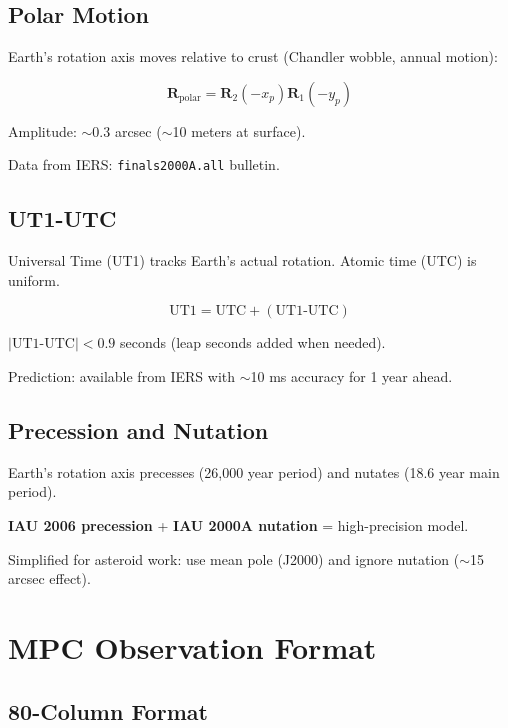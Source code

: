 \subsection{Polar Motion}

Earth's rotation axis moves relative to crust (Chandler wobble, annual motion):

\begin{equation}
    \mathbf{R}_{\text{polar}} = \mathbf{R}_2(-x_p)\mathbf{R}_1(-y_p)
\end{equation}

Amplitude: $\sim$0.3 arcsec ($\sim$10 meters at surface).

Data from IERS: \texttt{finals2000A.all} bulletin.

\subsection{UT1-UTC}

Universal Time (UT1) tracks Earth's actual rotation. Atomic time (UTC) is uniform.

\begin{equation}
    \text{UT1} = \text{UTC} + (\text{UT1-UTC})
\end{equation}

$|\text{UT1-UTC}| < 0.9$ seconds (leap seconds added when needed).

Prediction: available from IERS with $\sim$10 ms accuracy for 1 year ahead.

\subsection{Precession and Nutation}

Earth's rotation axis precesses (26,000 year period) and nutates (18.6 year main period).

\textbf{IAU 2006 precession} + \textbf{IAU 2000A nutation} = high-precision model.

Simplified for asteroid work: use mean pole (J2000) and ignore nutation ($\sim$15 arcsec effect).

\section{MPC Observation Format}

\subsection{80-Column Format}

